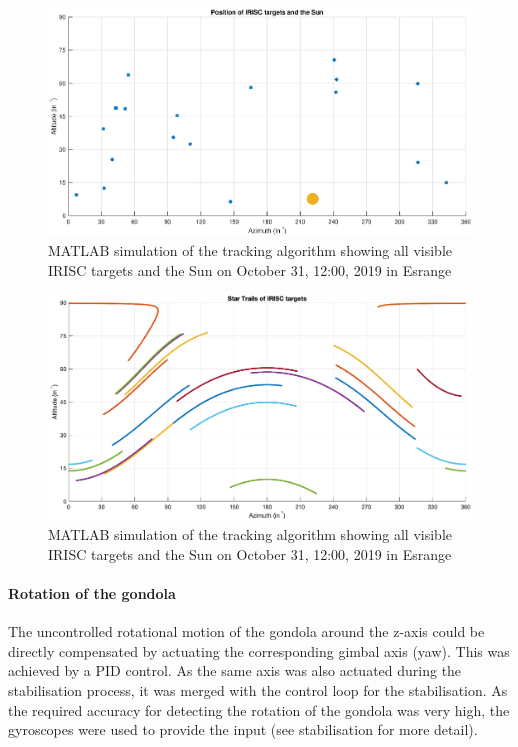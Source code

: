 \begin{figure}[htb]
    \centering
    \includegraphics[width = \textwidth]{4-experiment-design/img/software/position_map_31-10-19_12-00.eps}
    \caption{MATLAB simulation of the tracking algorithm showing all visible IRISC targets and the Sun on October 31, 12:00, 2019 in Esrange}
    \label{fig::software::position_map}
\end{figure}
\begin{figure}[htb]
    \centering
    \includegraphics[width = \textwidth]{4-experiment-design/img/software/star_trails_31-10-19_12-00.eps}
    \caption{MATLAB simulation of the tracking algorithm showing all visible IRISC targets and the Sun on October 31, 12:00, 2019 in Esrange}
    \label{fig::software::star_trails}
\end{figure}

\paragraph{Rotation of the gondola}

The uncontrolled rotational motion of the gondola around the z-axis could be directly compensated by actuating the corresponding gimbal axis (yaw). This was achieved by a PID control. As the same axis was also actuated during the stabilisation process, it was merged with the control loop for the stabilisation. As the required accuracy for detecting the rotation of the gondola was very high, the gyroscopes were used to provide the input (see stabilisation for more detail).



